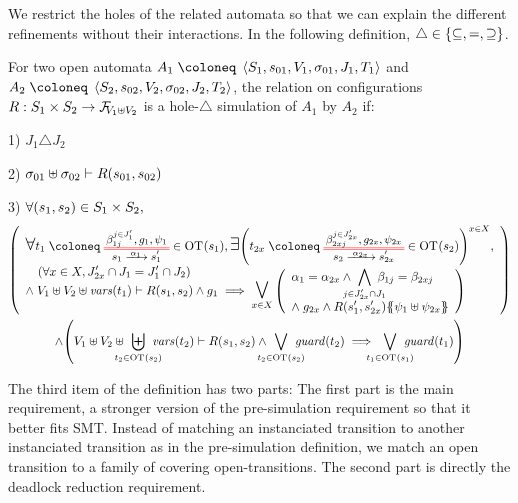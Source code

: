 \documentclass{article}
\begin{document}
We restrict the holes of the related automata so that we can explain the different refinements without their interactions.
In the following definition, \(\triangle \in \mbrc{\subseteq, =, \supseteq}\).
\begin{defi}
For two open automata \(A_1 \defobject \OAg[1]\) and \(A_2 \defobject \OAg[2]\), the relation on configurations \(R: S_1 \times S_2 \to \rformulas[V_1 \uplus V_2]\) is a hole-\(\triangle\) simulation of \(A_1\) by \(A_2\) if:
\item[1)] \(J_1 \triangle J_2\)
\item[2)] \(\sigma_{01} \uplus \sigma_{02} \vdash R\mpar{s_{01}, s_{02}}\)
\item[3)] \(\forall \mpar{s_1, s_2} \in S_1 \times S_2,\)\vspace{-8pt}
\noindent\begin{multline*}
	\mpar{\everymath{\displaystyle}\begin{array}{l}
		\bigsymb{\forall} t_1 \defobject \OTx{1}{}{1}{1} \in \fOT{s_1}, \bigsymb{\exists} \mpar{t_{2x} \defobject \OTx{2}{x}{2x}{2x} \in \fOT{s_2}}^{x \in X}, \\
		\quad \mpar{\forall x \in X, J'_{2x} \cap J_1 = J'_1 \cap J_2} \\[-10pt]
		\nwedge V_1 \uplus V_2 \uplus \fvars{t_1} \vdash R\mpar{s_1, s_2} \wedge g_1 \implies \operatorname*{\bigsymb{\bigvee}}_{x \in X} \mpar{\begin{array}{l}
			\alpha_1 = \alpha_{2x} \wedge \bigwedge_\subbox{j \in J'_{2x} \cap J_1} \beta_{1j} = \beta_{2xj} \\[12pt]
			\nwedge g_{2x} \wedge R\mpar{s'_1, s'_{2x}}\psubst{\psi_1 \uplus \psi_{2x}}
		\end{array}}
	\end{array}} \\
	\wedge \mpar{V_1 \uplus V_2 \uplus \biguplus_\subbox{t_2 \in \fOT{s_2}} \fvars{t_2} \vdash R\mpar{s_1, s_2} \wedge \bigvee_\subbox{t_2 \in \fOT{s_2}} \fguard{t_2} \implies \bigvee_\subbox{t_1 \in \fOT{s_1}} \fguard{t_1}}
\end{multline*}
\end{defi}
The third item of the definition has two parts:
The first part is the main requirement, a stronger version of the pre-simulation requirement so that it better fits SMT.
Instead of matching an instanciated transition to another instanciated transition as in the pre-simulation definition, we match an open transition to a family of covering open-transitions.
The second part is directly the deadlock reduction requirement.
\end{document}

